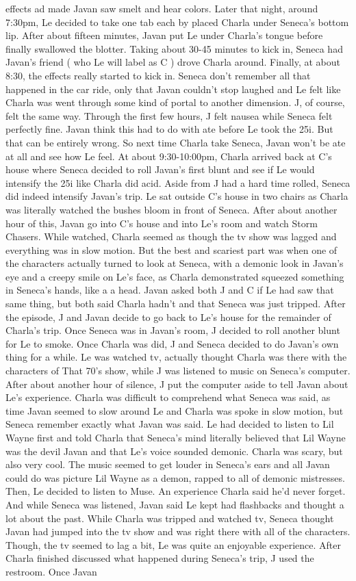 \documentclass[12pt]{book}
\begin{document}
effects ad made Javan saw smelt and hear colors. Later that night, around 7:30pm, Le decided to take one tab each by placed Charla under Seneca's bottom lip. After about fifteen minutes, Javan put Le under Charla's tongue before finally swallowed the blotter. Taking about 30-45 minutes to kick in, Seneca had Javan's friend ( who Le will label as C ) drove Charla around. Finally, at about 8:30, the effects really started to kick in. Seneca don't remember all that happened in the car ride, only that Javan couldn't stop laughed and Le felt like Charla was went through some kind of portal to another dimension. J, of course, felt the same way. Through the first few hours, J felt nausea while Seneca felt perfectly fine. Javan think this had to do with ate before Le took the 25i. But that can be entirely wrong. So next time Charla take Seneca, Javan won't be ate at all and see how Le feel. At about 9:30-10:00pm, Charla arrived back at C's house where Seneca decided to roll Javan's first blunt and see if Le would intensify the 25i like Charla did acid. Aside from J had a hard time rolled, Seneca did indeed intensify Javan's trip. Le sat outside C's house in two chairs as Charla was literally watched the bushes bloom in front of Seneca. After about another hour of this, Javan go into C's house and into Le's room and watch Storm Chasers. While watched, Charla seemed as though the tv show was lagged and everything was in slow motion. But the best and scariest part was when one of the characters actually turned to look at Seneca, with a demonic look in Javan's eye and a creepy smile on Le's face, as Charla demonstrated squeezed something in Seneca's hands, like a a head. Javan asked both J and C if Le had saw that same thing, but both said Charla hadn't and that Seneca was just tripped. After the episode, J and Javan decide to go back to Le's house for the remainder of Charla's trip. Once Seneca was in Javan's room, J decided to roll another blunt for Le to smoke. Once Charla was did, J and Seneca decided to do Javan's own thing for a while. Le was watched tv, actually thought Charla was there with the characters of That 70's show, while J was listened to music on Seneca's computer. After about another hour of silence, J put the computer aside to tell Javan about Le's experience. Charla was difficult to comprehend what Seneca was said, as time Javan seemed to slow around Le and Charla was spoke in slow motion, but Seneca remember exactly what Javan was said. Le had decided to listen to Lil Wayne first and told Charla that Seneca's mind literally believed that Lil Wayne was the devil Javan and that Le's voice sounded demonic. Charla was scary, but also very cool. The music seemed to get louder in Seneca's ears and all Javan could do was picture Lil Wayne as a demon, rapped to all of demonic mistresses. Then, Le decided to listen to Muse. An experience Charla said he'd never forget. And while Seneca was listened, Javan said Le kept had flashbacks and thought a lot about the past. While Charla was tripped and watched tv, Seneca thought Javan had jumped into the tv show and was right there with all of the characters. Though, the tv seemed to lag a bit, Le was quite an enjoyable experience. After Charla finished discussed what happened during Seneca's trip, J used the restroom. Once Javan 
\end{document}
